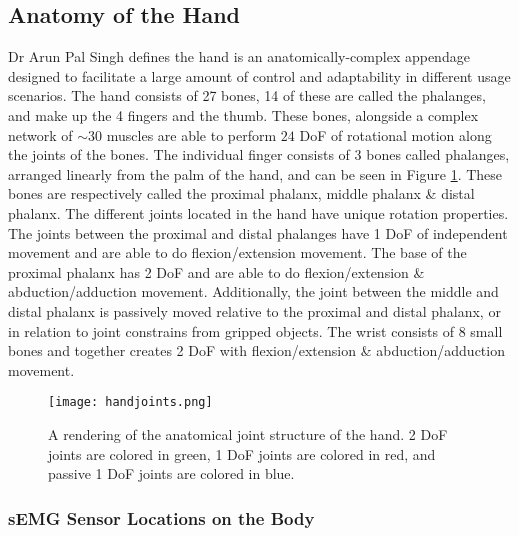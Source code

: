 \documentclass[../main.tex]{subfiles}
\begin{document}
\subsection{Anatomy of the Hand}
\label{sec:anatomy}

Dr Arun Pal Singh \cite{anatomy} defines the hand is an anatomically-complex appendage designed to facilitate a large amount of control and adaptability in different usage scenarios.
The hand consists of 27 bones, 14 of these are called the \gls{phalanges}, and make up the 4 fingers and the thumb.
These bones, alongside a complex network of $\sim30$ muscles are able to perform $24$ \gls{DoF} of rotational motion along the joints of the bones.
The individual finger consists of 3 bones called \gls{phalanges}, arranged linearly from the palm of the hand, and can be seen in Figure \ref{fig:anatomy}.
These bones are respectively called the \gls{proximal phalanx}, \gls{middle phalanx} \& \gls{distal phalanx}.
The different joints located in the hand have unique rotation properties.
The joints between the proximal and distal phalanges have 1 \gls{DoF} of independent movement and are able to do \gls{flexion/extension} movement.
The base of the proximal phalanx has 2 \gls{DoF} and are able to do \gls{flexion/extension} \& \gls{abduction/adduction} movement.
Additionally, the joint between the middle and distal phalanx is passively moved relative to the proximal and distal phalanx, or in relation to joint constrains from gripped objects.
The wrist consists of 8 small bones and together creates 2 \gls{DoF} with \gls{flexion/extension} \& \gls{abduction/adduction} movement.

\begin{figure}[H]
\begin{center}
\texttt{[image: handjoints.png]}
\caption{A rendering of the anatomical joint structure of the hand. 2 \gls{DoF} joints are colored in green, 1 \gls{DoF} joints are colored in red, and passive 1 \gls{DoF} joints are colored in blue.}
\label{fig:anatomy}
\end{center}
\end{figure}

\subsubsection{sEMG Sensor Locations on the Body}
\label{sec:muscleplacements}
\end{document}
